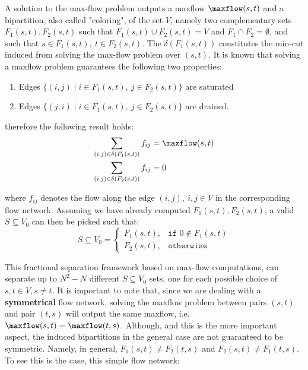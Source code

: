 A solution to the max-flow problem outputs a maxflow $\maxflow(s, t)$ and a bipartition, also called "coloring", of the set $V$, namely two complementary sets $F_1(s, t), F_2(s, t)$ such that $F_1(s, t) \cup F_2(s, t) = V$ and $F_1 \cap F_2 = \emptyset$, and such that $s \in F_1(s, t),\ t \in F_2(s, t)$.
The $\delta(F_1(s, t))$ constitutes the min-cut induced from solving the max-flow problem over $(s, t)$.
It is known that solving a maxflow problem guarantees the following two properties:

\begin{enumerate}
	\item Edges $\{ (i, j) \mid i \in F_1(s, t),\ j \in F_2(s, t) \}$ are saturated
	\item Edges $\{ (j, i) \mid i \in F_1(s, t),\ j \in F_2(s, t) \}$ are drained.
\end{enumerate}

therefore the following result holds:
\begin{align}
	\sum_{(i, j) \in \delta(F_1(s, t))} f_{ij} & = \maxflow(s, t) \\
	\sum_{(i, j) \in \delta(F_2(s, t))} f_{ij} & = 0
\end{align}

where $f_{ij}$ denotes the flow along the edge $(i, j),\ i, j \in V$ in the corresponding flow network.
Assuming we have already computed $F_1(s, t), F_2(s, t)$, a valid $S \subseteq V_0$ can then be picked such that:
\begin{equation}
	S \subseteq V_0 =
	\begin{cases}
		F_1(s, t), & \texttt{if } 0 \notin F_1(s, t) \\
		F_2(s, t), & \texttt{otherwise}
	\end{cases}
\end{equation}

This fractional separation framework based on max-flow computations, can separate up to $N^2 - N$ different $S \subseteq V_0$ sets, one for each possible choice of $s, t \in V, s \ne t$.
It is important to note that, since we are dealing with a \textbf{symmetrical} flow network, solving the maxflow problem between pairs $(s, t)$ and pair $(t, s)$ will output the same maxflow, i.e. $\maxflow(s, t) = \maxflow(t, s)$.
Although, and this is the more important aspect, the induced bipartitions in the general case are not guaranteed to be symmetric.
Namely, in general, $F_1(s, t) \ne F_2(t, s)$ and $F_2(s, t) \ne F_1(t, s)$.
To see this is the case, this simple flow network:

